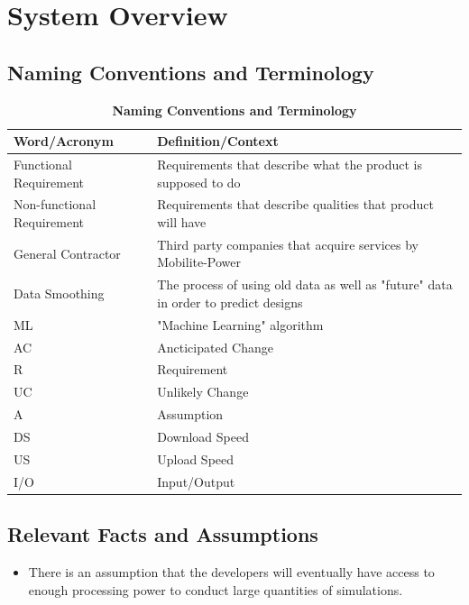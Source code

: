 \documentclass[12pt, titlepage]{article}
\begin{document}
\section{System Overview}

\subsection{Naming Conventions and Terminology}

\begin{table}[htp]
\caption{\bf Naming Conventions and Terminology}
\begin{tabular}{ |p{6cm}|p{8cm}|  } 
 \hline
\bf Word/Acronym & \bf Definition/Context\\
 \hline
 Functional Requirement & Requirements that describe what the product is supposed to do\\
 \hline
Non-functional Requirement & Requirements that describe qualities that product will have\\
 \hline
General Contractor & Third party companies that acquire services by Mobilite-Power\\
 \hline
Data Smoothing & The process of using old data as well as "future" data in order to predict designs\\
 \hline
ML & "Machine Learning" algorithm\\
\hline
AC & Ancticipated Change\\
\hline 
R & Requirement\\
\hline 
UC & Unlikely Change\\
\hline 
A & Assumption\\
\hline 
DS & Download Speed\\
\hline
US & Upload Speed\\
\hline
I/O & Input/Output\\
\hline
\end{tabular}
\end{table}

\subsection{Relevant Facts and Assumptions}
\begin{itemize}
    \item There is an assumption that the developers will eventually have access to enough processing power to conduct large quantities of simulations.

\end{itemize}
\end{document}
